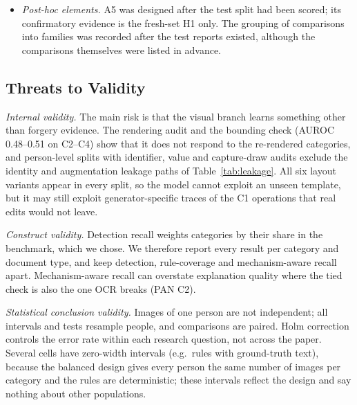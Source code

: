 \documentclass[conference]{IEEEtran}
\begin{document}
\begin{itemize}
weights all use the same 45-person validation split. Visual scores on
that split are therefore somewhat optimistic (AUROC 0.780 against 0.720
on test), which may give the visual input more weight in fusion than it
deserves. The test and fresh-set results remain unbiased estimates for
the frozen systems, but the fitted weights need not be the best
achievable.
\item \emph{Post-hoc elements.} A5 was designed after the test split had
been scored; its confirmatory evidence is the fresh-set H1 only. The
grouping of comparisons into families was recorded after the test
reports existed, although the comparisons themselves were listed in
advance.
\end{itemize}

\subsection{Threats to Validity}
\label{sec:discussion-threats}

\emph{Internal validity.} The main risk is that the visual branch
learns something other than forgery evidence. The rendering audit and
the bounding check (AUROC 0.48--0.51 on C2--C4) show that it does not
respond to the re-rendered categories, and person-level splits with
identifier, value and capture-draw audits exclude the identity and
augmentation leakage paths of Table~\ref{tab:leakage}. All six layout
variants appear in every split, so the model cannot exploit an unseen
template, but it may still exploit generator-specific traces of the C1
operations that real edits would not leave.

\emph{Construct validity.} Detection recall weights categories by their
share in the benchmark, which we chose. We therefore report every
result per category and document type, and keep detection,
rule-coverage and mechanism-aware recall apart. Mechanism-aware recall
can overstate explanation quality where the tied check is also the one
OCR breaks (PAN C2).

\emph{Statistical conclusion validity.} Images of one person are not
independent; all intervals and tests resample people, and comparisons
are paired. Holm correction controls the error rate within each
research question, not across the paper. Several cells have zero-width
intervals (e.g.\ rules with ground-truth text), because the balanced
design gives every person the same number of images per category and
the rules are deterministic; these intervals reflect the design and
say nothing about other populations.
\end{document}
